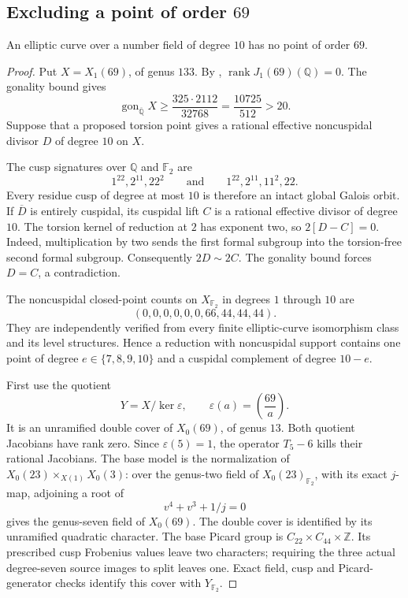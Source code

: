 \subsection{Excluding a point of order $69$}
\begin{proposition}\label{prop:decic-no69}
An elliptic curve over a number field of degree $10$ has no point of order $69$.
\end{proposition}
\begin{proof}
Put $X=X_1(69)$, of genus $133$. By \cite[Theorem~3.1]{DEHMZ},
$\operatorname{rank}J_1(69)(\mathbb Q)=0$.
The gonality bound gives
\[
 \operatorname{gon}_{\overline{\mathbb Q}}X\geq
 \frac{325\cdot2112}{32768}=\frac{10725}{512}>20.
\]
Suppose that a proposed torsion point gives a rational effective
noncuspidal divisor $D$ of degree $10$ on $X$.

The cusp signatures over $\mathbb Q$ and $\mathbb F_2$ are
\[
 1^{22},2^{11},22^2\qquad\text{and}\qquad1^{22},2^{11},11^2,22.
\]
Every residue cusp of degree at most $10$ is therefore an intact
global Galois orbit. If $\overline D$ is entirely cuspidal, its
cuspidal lift $C$ is a rational effective divisor of degree $10$.
The torsion kernel of reduction at $2$ has exponent two, so
$2[D-C]=0$. Indeed, multiplication by two sends the first formal
subgroup into the torsion-free second formal subgroup.
Consequently $2D\sim2C$. The gonality bound forces $D=C$, a
contradiction.

The noncuspidal closed-point counts on $X_{\mathbb F_2}$ in
degrees $1$ through $10$ are
\[
 (0,0,0,0,0,0,66,44,44,44).
\]
They are independently verified from every finite elliptic-curve
isomorphism class and its level structures. Hence a reduction
with noncuspidal support contains one point of degree
$e\in\{7,8,9,10\}$ and a cuspidal complement of degree $10-e$.

First use the quotient
\[
 Y=X/\ker\varepsilon,\qquad
 \varepsilon(a)=\left(\frac{69}{a}\right).
\]
It is an unramified double cover of $X_0(69)$, of genus $13$.
Both quotient Jacobians have rank zero. Since
$\varepsilon(5)=1$, the operator $T_5-6$ kills their rational
Jacobians. The base model is the normalization of
$X_0(23)\times_{X(1)}X_0(3)$: over the genus-two field of
$X_0(23)_{\mathbb F_2}$, with its exact $j$-map, adjoining a root of
\[
 v^4+v^3+1/j=0
\]
gives the genus-seven field of $X_0(69)$.
The double cover is identified by its unramified quadratic
character. The base Picard group is
$C_{22}\times C_{44}\times\mathbb Z$.
Its prescribed cusp Frobenius values leave two characters;
requiring the three actual degree-seven source images to split
leaves one. Exact field, cusp and Picard-generator checks identify
this cover with $Y_{\mathbb F_2}$.


\end{proof}
